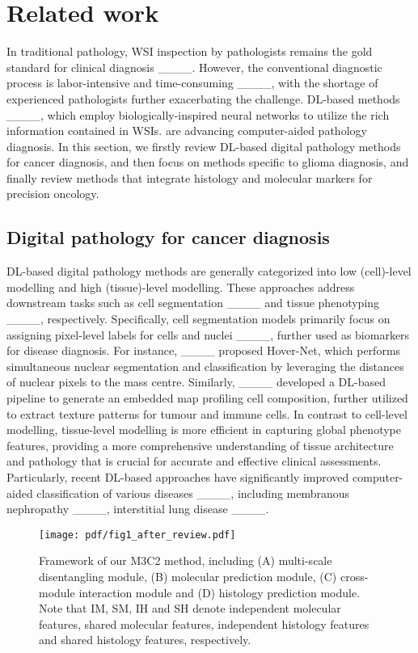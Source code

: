 \section{Related work}
In traditional pathology,  WSI inspection by pathologists remains the gold standard for clinical diagnosis ____. However, the conventional diagnostic process is labor-intensive and time-consuming ____, with the shortage of experienced pathologists further exacerbating the challenge. DL-based methods ____, which employ biologically-inspired neural networks to utilize the rich information contained in WSIs. are advancing computer-aided pathology diagnosis. In this section, we firstly review DL-based digital pathology methods for cancer diagnosis, and then focus on  methods specific to glioma diagnosis, and finally review methods that integrate histology and molecular markers for precision oncology.


\subsection{Digital pathology for cancer diagnosis}



DL-based digital pathology methods are generally  categorized into low (cell)-level modelling and high (tissue)-level modelling. These approaches address downstream tasks such as cell segmentation ____ and tissue phenotyping  ____, respectively. Specifically, cell segmentation models primarily focus on assigning pixel-level labels for cells and nuclei ____, further used as biomarkers for disease diagnosis. For instance, ____ proposed Hover-Net, which performs simultaneous nuclear segmentation and classification by leveraging the distances of nuclear pixels to the mass centre. Similarly, ____  developed a DL-based pipeline to generate an embedded map profiling cell composition,  further utilized to extract texture patterns for tumour and immune cells. 
In contrast to cell-level modelling, tissue-level modelling is more efficient in capturing global phenotype features,  providing a more comprehensive understanding of tissue architecture and pathology that is crucial for accurate and effective clinical assessments. Particularly, recent DL-based approaches  have significantly improved computer-aided classification of various diseases ____, including membranous nephropathy ____, interstitial lung disease ____. 


  \begin{figure*}[t]
    \centering
    \texttt{[image: pdf/fig1\_after\_review.pdf]}
    \caption{Framework of our M3C2 method, including (A) multi-scale disentangling module, (B) molecular prediction module, (C) cross-module interaction module and (D) histology prediction module. Note that IM, SM, IH and SH denote independent molecular features, shared molecular features, independent histology features and shared histology features, respectively.}
    \label{fig:framework}
\end{figure*}



